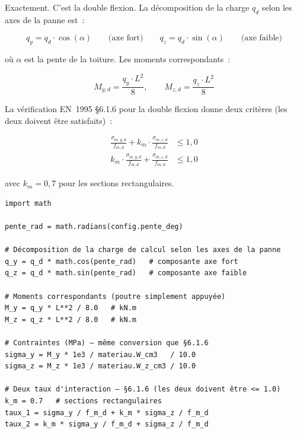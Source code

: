 \documentclass[12pt, a4paper, openany]{book}
\begin{document}
\begin{maitre}
Exactement. C'est la double flexion.
La d\'ecomposition de la charge $q_d$ selon les axes de la panne est~:
\end{maitre}

\begin{equation}
q_y = q_d \cdot \cos(\alpha) \qquad \text{(axe fort)}
\qquad
q_z = q_d \cdot \sin(\alpha) \qquad \text{(axe faible)}
\label{eq:decomp}
\end{equation}

\noindent o\`u $\alpha$ est la pente de la toiture. Les moments correspondants~:

\begin{equation}
M_{y,d} = \frac{q_y \cdot L^2}{8}, \qquad M_{z,d} = \frac{q_z \cdot L^2}{8}
\end{equation}

La v\'erification EN~1995 \S{}6.1.6 pour la double flexion donne
deux crit\`eres (les deux doivent \^etre satisfaits)~:

\begin{align}
\frac{\sigma_{m,y,d}}{f_{m,d}} + k_m \cdot \frac{\sigma_{m,z,d}}{f_{m,d}} &\leq 1{,}0
\label{eq:biaxial1}\\
k_m \cdot \frac{\sigma_{m,y,d}}{f_{m,d}} + \frac{\sigma_{m,z,d}}{f_{m,d}} &\leq 1{,}0
\label{eq:biaxial2}
\end{align}

\noindent avec $k_m = 0{,}7$ pour les sections rectangulaires.

\begin{lstlisting}[style=python, caption={Décomposition de charge et interaction biaxiale}]
import math

pente_rad = math.radians(config.pente_deg)

# Décomposition de la charge de calcul selon les axes de la panne
q_y = q_d * math.cos(pente_rad)   # composante axe fort
q_z = q_d * math.sin(pente_rad)   # composante axe faible

# Moments correspondants (poutre simplement appuyée)
M_y = q_y * L**2 / 8.0   # kN.m
M_z = q_z * L**2 / 8.0   # kN.m

# Contraintes (MPa) — même conversion que §6.1.6
sigma_y = M_y * 1e3 / materiau.W_cm3   / 10.0
sigma_z = M_z * 1e3 / materiau.W_z_cm3 / 10.0

# Deux taux d'interaction — §6.1.6 (les deux doivent être <= 1.0)
k_m = 0.7   # sections rectangulaires
taux_1 = sigma_y / f_m_d + k_m * sigma_z / f_m_d
taux_2 = k_m * sigma_y / f_m_d + sigma_z / f_m_d
\end{lstlisting}
\end{document}
